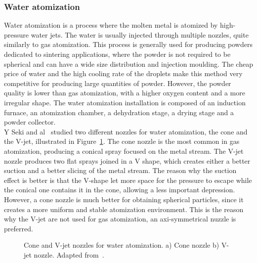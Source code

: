 \documentclass[../main]{subfiles}
\begin{document}
\subsubsection{Water atomization}

Water atomization is a process where the molten metal is atomized by high-pressure water jets. The water is usually injected through multiple nozzles, quite similarly to gas atomization. This process is generally used for producing powders dedicated to sintering applications, where the powder is not required to be spherical and can have a wide size distribution and injection moulding. The cheap price of water and the high cooling rate of the droplets make this method very competitive for producing large quantities of powder. However, the powder quality is lower than gas atomization, with a higher oxygen content and a more irregular shape. The water atomization installation is composed of an induction furnace, an atomization chamber, a dehydration stage, a drying stage and a powder collector.\\

Y Seki and al~\cite{Seki1990EffectAtomization} studied two different nozzles for water atomization, the cone and the V-jet, illustrated in Figure~\ref{f:water_nozzle}. The cone nozzle is the most common in gas atomization, producing a conical spray focused on the metal stream. The V-jet nozzle produces two flat sprays joined in a V shape, which creates either a better suction and a better slicing of the metal stream. The reason why the suction effect is better is that the V-shape let more space for the pressure to escape while the conical one contains it in the cone, allowing a less important depression. However, a cone nozzle is much better for obtaining spherical particles, since it creates a more uniform and stable atomization environment. This is the reason why the V-jet are not used for gas atomization, an axi-symmetrical nuzzle is preferred.\\ 

\vspace{0mm}
\begin{figure}[H]
    \centering
        
        \caption[Cone and V-jet nozzles for water atomization.]{Cone and V-jet nozzles for water atomization. a) Cone nozzle b) V-jet nozzle. Adapted from~\cite{Seki1990EffectAtomization, Neikov2009HandbookNonFerrous}.}
        \label{f:water_nozzle}
\end{figure}
\FloatBarrier
\vspace{0mm}
\end{document}
